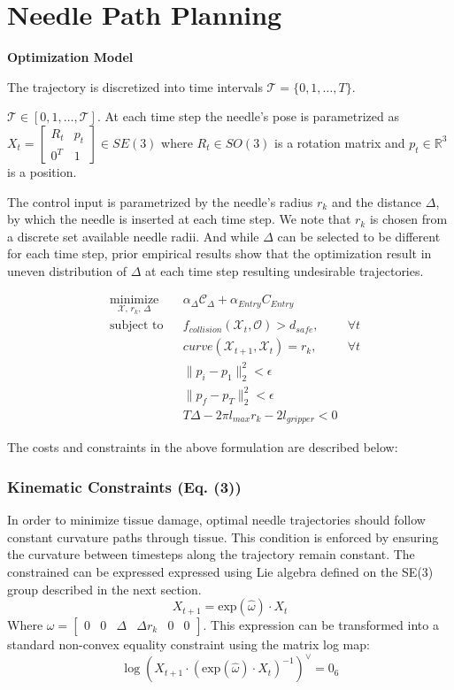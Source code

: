 \documentclass[0-suturing.tex]{subfiles}
\begin{document}
\section{Needle Path Planning}
\noindent \textbf{Optimization Model}

The trajectory is discretized into time intervals $\mathcal{T} = \{0,1,\ldots,T\}$.


$\mathcal{T} \in [0, 1, \ldots, \mathcal{T}]$.
At each time step the needle's pose is parametrized as
$X_t = \begin{bmatrix}
    R_t & p_t \\ 0^T & 1
\end{bmatrix} \in SE(3)$
where $R_t \in SO(3)$ is a rotation matrix and
$ p_t \in  \mathbb{R}^3 $ is a position.

The control input is parametrized by the needle's radius $r_k$ and the distance $\Delta$, by which the needle is inserted at each time step. We note that $r_k$ is chosen from a discrete set available needle radii. And while $\Delta$ can be selected to be different for each time step, prior empirical results show that the optimization result in uneven distribution of $\Delta$ at each time step resulting undesirable trajectories.


\begin{align}
& \underset{\mathcal{X},\, r_k,\, \Delta}{\text{minimize}}
& & \alpha_\Delta \mathcal{C}_\Delta + \alpha_{Entry} C_{Entry} \\
& \text{subject to}
& & f_{collision}(\mathcal{X}_t, \mathcal{O}) > d_{safe}, & \forall t  \\
& & & curve(\mathcal{X}_{t+1}, \mathcal{X}_t) = r_k, & \forall t  \\
& & & \|p_i-p_1\|_2^2 < \epsilon \\
& & & \|p_f-p_T\|_2^2 < \epsilon \\
& & & T \Delta - 2 \pi l_{max}r_k - 2l_{gripper} < 0 
\end{align}

The costs and constraints in the above formulation are described below:

\subsubsection{Kinematic Constraints (Eq. (3))}
In order to minimize tissue damage, optimal needle trajectories should follow constant curvature paths through tissue. This condition is enforced by ensuring the curvature between timesteps along the trajectory remain 
constant. The constrained can be expressed expressed using Lie algebra defined on the SE(3) group described in the next section.
\begin{equation}
    X_{t+1} =  \text{exp}(\hat{\omega}) \cdot X_{t}
\end{equation}
Where $\omega = \begin{bmatrix} 0 & 0 & \Delta & \Delta r_k & 0 & 0\end{bmatrix}$.
This expression can be transformed into a standard non-convex equality constraint using the matrix log map:
\begin{equation}
    \log(X_{t+1} \cdot (\text{exp}(\hat{\omega}) \cdot X_{t})^{-1})^{\vee} = 0_6   
\end{equation}
\end{document}
